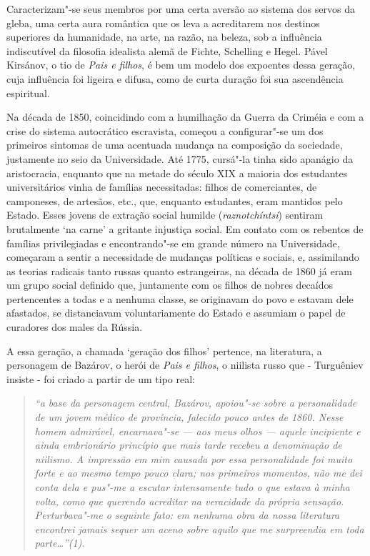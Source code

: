Caracterizam"-se seus membros por uma certa aversão ao sistema dos servos
da gleba, uma certa aura romântica que os leva a acreditarem nos
destinos superiores da humanidade, na arte, na razão, na beleza, sob a
influência indiscutível da filosofia idealista alemã de Fichte,
Schelling e Hegel. Pável Kirsánov, o tio de \emph{Pais e filhos}, é bem
um modelo dos expoentes dessa geração, cuja influência foi ligeira e
difusa, como de curta duração foi sua ascendência espiritual.

Na década de 1850, coincidindo com a humilhação da Guerra da Criméia e
com a crise do sistema autocrático escravista, começou a configurar"-se
um dos primeiros sintomas de uma acentuada mudança na composição da
sociedade, justamente no seio da Universidade. Até 1775, cursá"-la tinha
sido apanágio da aristocracia, enquanto que na metade do século XIX a
maioria dos estudantes universitários vinha de famílias necessitadas:
filhos de comerciantes, de camponeses, de artesãos, etc., que, enquanto
estudantes, eram mantidos pelo Estado. Esses jovens de extração social
humilde (\emph{raznotchíntsi}) sentiram brutalmente `na carne' a
gritante injustiça social. Em contato com os rebentos de famílias
privilegiadas e encontrando"-se em grande número na Universidade,
começaram a sentir a necessidade de mudanças políticas e sociais, e,
assimilando as teorias radicais tanto russas quanto estrangeiras, na
década de 1860 já eram um grupo social definido que, juntamente com os
filhos de nobres decaídos pertencentes a todas e a nenhuma classe, se
originavam do povo e estavam dele afastados, se distanciavam
voluntariamente do Estado e assumiam o papel de curadores dos males da
Rússia.

A essa geração, a chamada `geração dos filhos' pertence, na literatura,
a personagem de Bazárov, o herói de \emph{Pais e filhos}, o niilista
russo que - Turguêniev insiste - foi criado a partir de um tipo real:

\begin{quote}
\emph{``a base da personagem central, Bazárov, apoiou"-se sobre a
personalidade de um jovem médico de província, falecido pouco antes de
1860. Nesse homem admirável, encarnava"-se --- aos meus olhos --- aquele
incipiente e ainda embrionário princípio que mais tarde recebeu a
denominação de niilismo. A impressão em mim causada por essa
personalidade foi muito forte e ao mesmo tempo pouco clara; nos
primeiros momentos, não me dei conta dela e pus"-me a escutar
intensamente tudo o que estava à minha volta, como que querendo
acreditar na veracidade da própria sensação. Perturbava"-me o seguinte
fato: em nenhuma obra da nossa literatura encontrei jamais sequer um
aceno sobre aquilo que me surpreendia em toda parte\ldots{}''(1).}
\end{quote}

